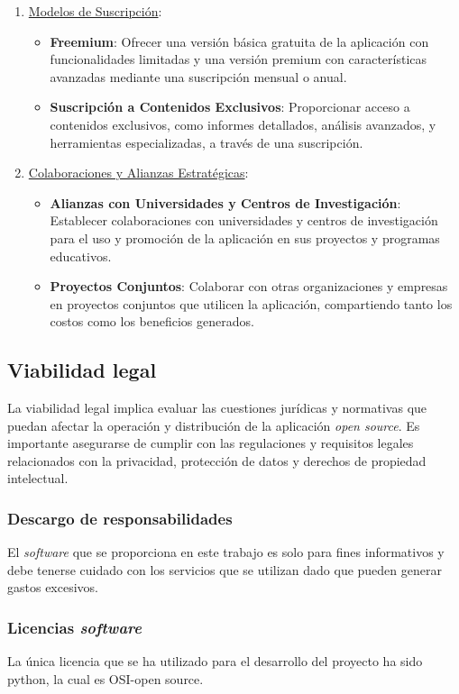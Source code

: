 \begin{enumerate}
    \item \underline{Modelos de Suscripción}:
    \begin{itemize}
        \item \textbf{Freemium}: Ofrecer una versión básica gratuita de la aplicación con funcionalidades limitadas y una versión premium con características avanzadas mediante una suscripción mensual o anual.
        \item \textbf{Suscripción a Contenidos Exclusivos}: Proporcionar acceso a contenidos exclusivos, como informes detallados, análisis avanzados, y herramientas especializadas, a través de una suscripción.
    \end{itemize}

    \item \underline{Colaboraciones y Alianzas Estratégicas}:
    \begin{itemize}
        \item \textbf{Alianzas con Universidades y Centros de Investigación}: Establecer colaboraciones con universidades y centros de investigación para el uso y promoción de la aplicación en sus proyectos y programas educativos.
        \item \textbf{Proyectos Conjuntos}: Colaborar con otras organizaciones y empresas en proyectos conjuntos que utilicen la aplicación, compartiendo tanto los costos como los beneficios generados.
    \end{itemize}
\end{enumerate}

\subsection{Viabilidad legal}\label{sec:Viabilidad legal}

La viabilidad legal implica evaluar las cuestiones jurídicas y normativas que puedan afectar la operación y distribución de la aplicación \textit{open source}. Es importante asegurarse de cumplir con las regulaciones y requisitos legales relacionados con la privacidad, protección de datos y derechos de propiedad intelectual.

\subsubsection{Descargo de responsabilidades}

El \emph{software} que se proporciona en este trabajo es solo para fines informativos y debe tenerse cuidado con los servicios que se utilizan dado que pueden generar gastos excesivos. 

\subsubsection{Licencias \emph{software}}
La única licencia que se ha utilizado para el desarrollo del proyecto ha sido python, la cual es OSI-open source. 